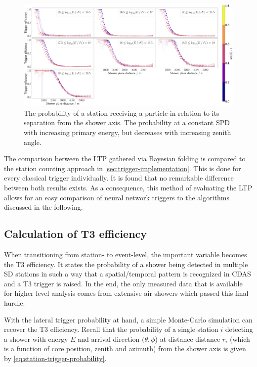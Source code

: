 \begin{figure}
	\centering
	\includegraphics[width=1\textwidth]{./plots/LPP.png}
	\caption{The probability of a station receiving a particle in relation to its separation from the shower axis. The probability at a constant SPD with 
	increasing primary energy, but decreases with increasing zenith angle.}
	\label{fig:lateral-particle-probability}
\end{figure}

The comparison between the LTP gathered via Bayesian folding is compared to the \Offline station counting approach in \autoref{sec:trigger-implementation}. This is
done for every classical trigger individually. It is found that no remarkable difference between both results exists. As a consequence, this method of evaluating 
the LTP allows for an easy comparison of neural network triggers to the algorithms discussed in the following. 

\subsection{Calculation of T3 efficiency}
\label{ssec:t3-calculation}

When transitioning from station- to event-level, the important variable becomes the T3 efficiency. It states the probability of a shower being detected in multiple
SD stations in such a way that a spatial/temporal pattern is recognized in CDAS and a T3 trigger is raised. In the end, the only measured data that is available 
for higher level analysis comes from extensive air showers which passed this final hurdle.

With the lateral trigger probability at hand, a simple Monte-Carlo simulation can recover the T3 efficiency. Recall that the probability of a single station $i$
detecting a shower with energy $E$ and arrival direction $(\theta, \phi$) at distance distance $r_i$ (which is a function of core position, zenith and azimuth) 
from the shower axis is given by \autoref{eq:station-trigger-probability}.

